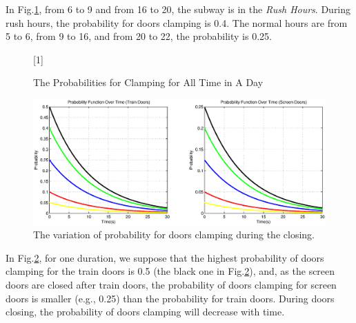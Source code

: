 \documentclass[12pt,a4paper]{article}
\author{fofo}
\begin{document}
In Fig.\ref{fig:ProClamping}, from 6 to 9 and from 16 to 20, the subway is in the {\em Rush Hours}. During rush hours, the probability for doors clamping is 0.4. The normal hours are from 5 to 6, from 9 to 16, and from 20 to 22, the probability is 0.25.

\begin{figure}
\centering
\scalebox{1}[1]{
}
\caption{The Probabilities for Clamping for All Time in A Day}
\label{fig:ProClamping}
\end{figure}

\begin{figure}[tbph]
\centering
\includegraphics[width=1.0\linewidth]{./figures/ProbabilityOverTimeFigure}
\caption{The variation of probability for doors clamping during the closing.}
\label{fig:ProbabilityOverTimeFigure}
\end{figure}
In Fig.\ref{fig:ProbabilityOverTimeFigure}, for one duration, we suppose that the highest probability of doors clamping for the train doors is 0.5 (the black one in Fig.\ref{fig:ProbabilityOverTimeFigure}), and, as the screen doors are closed after train doors, the probability of doors clamping for screen doors is smaller (e.g., 0.25) than the probability for train doors.
During doors closing, the probability  of doors clamping will decrease with time.

\end{document}
